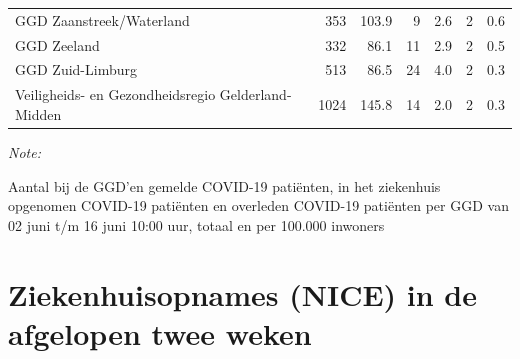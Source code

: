 \documentclass[
  english,
  man,floatsintext]{apa6}
\begin{document}
\begin{table}
\begin{threeparttable}
\begin{tabular}{lrrrrrr}
GGD Zaanstreek/Waterland & 353 & 103.9 & 9 & 2.6 & 2 & 0.6\\
GGD Zeeland & 332 & 86.1 & 11 & 2.9 & 2 & 0.5\\
GGD Zuid-Limburg & 513 & 86.5 & 24 & 4.0 & 2 & 0.3\\
Veiligheids- en Gezondheidsregio Gelderland-Midden & 1024 & 145.8 & 14 & 2.0 & 2 & 0.3\\
\bottomrule
\end{tabular}
\begin{tablenotes}
\item \textit{Note: } 
\item Aantal bij de GGD’en gemelde COVID-19 patiënten, in het ziekenhuis opgenomen COVID-19 patiënten en overleden COVID-19 patiënten per GGD van 02 juni t/m 16 juni 10:00 uur, totaal en per 100.000 inwoners
\end{tablenotes}
\end{threeparttable}
\endgroup{}
\end{table}

\newpage

\hypertarget{ziekenhuisopnames-nice-in-de-afgelopen-twee-weken}{%
\section{Ziekenhuisopnames (NICE) in de afgelopen twee weken}\label{ziekenhuisopnames-nice-in-de-afgelopen-twee-weken}}
\end{document}
